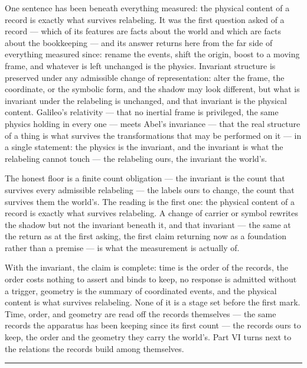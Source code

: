 One sentence has been beneath everything measured: the physical content of a record is exactly what survives
relabeling. It was the first question asked of a record --- which of its features are facts about the world
and which are facts about the bookkeeping --- and its answer returns here from the far side of everything
measured since: rename the
events, shift the origin, boost to a moving frame, and whatever is left unchanged is the physics.
Invariant structure is preserved under any
admissible change of representation: alter the frame, the coordinate, or the symbolic form, and the shadow may
look different, but what is invariant under the relabeling is unchanged, and that invariant is the physical
content. Galileo's relativity --- that no inertial frame is privileged, the same physics holding in every one
--- meets Abel's invariance --- that the real structure of a thing is what survives the transformations that
may be performed on it --- in a single statement: the physics is the invariant, and the invariant is what the
relabeling cannot touch --- the relabeling ours, the invariant the world's.

The honest floor is a finite count obligation --- the invariant is the count that survives every admissible
relabeling --- the labels ours to change, the count that survives them the world's. The reading is the first
one: the physical content of a record is exactly what
survives relabeling. A change of carrier or symbol rewrites the shadow but not the invariant beneath it, and
that invariant --- the same at the return as at the first asking, the first claim returning now as a
foundation rather than a premise --- is what the measurement is actually of.

\bigskip

With the invariant, the claim is complete: time is the order of the records, the order
costs nothing to assert and binds to keep, no response is admitted without a trigger, geometry is the summary
of coordinated events, and the physical content is what survives relabeling. None of it is a stage set before
the first mark. Time, order, and geometry are read off the records themselves --- the same records the
apparatus has been keeping since its first count --- the records ours to keep, the order and the geometry they
carry the world's. Part VI turns next to the relations the records
build among themselves.

\bigskip
\begin{center}
\rule{0.4\textwidth}{0.4pt}
\end{center}
\bigskip

